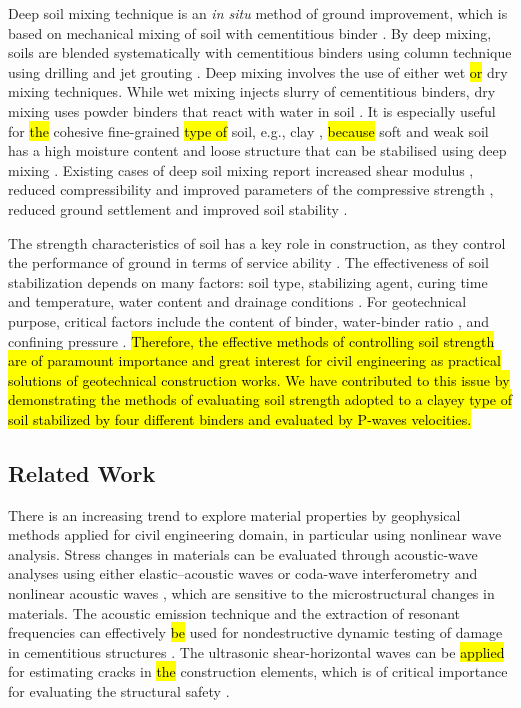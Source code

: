 \documentclass[USenglish,twocolumn]{article}
\begin{document}
Deep soil mixing technique is an \emph{in situ} method of ground improvement, which is based on mechanical mixing of soil with cementitious binder \cite{Kitazume,PorbahaetalA}. By deep mixing, soils are blended systematically with cementitious binders using column technique using drilling and jet grouting \cite{Larssonetal2015,Larsson}. Deep mixing involves the use of either wet \hl{or} dry mixing techniques. While wet mixing injects slurry of cementitious binders, dry mixing uses powder binders that react with\hl{ }water in\hl{ }soil \cite{PorbahaetalB}. It is especially useful for \hl{the }cohesive fine-grained \hl{type of }soil, e.g., clay \cite{Dahlstroem,Xieetal2012}, \hl{because }soft and weak soil has a high moisture content and loose structure that can be stabilised using deep mixing \cite{PorbahaetalC}. Existing cases of deep soil mixing report increased shear modulus \cite{Fangetal2001}, reduced compressibility and improved parameters of the compressive strength \cite{Mypati}, reduced ground settlement and improved soil stability \cite{Bergado}.

The strength characteristics of soil has a key role in construction, as they control the performance of ground in terms of service ability \cite{Munfakh}. The effectiveness of soil stabilization depends on many factors: soil type, stabilizing agent, curing time and temperature, water content and drainage conditions \cite{Winterkorn1991b}. For geotechnical purpose, critical factors include the content of binder, water-binder ratio \cite{Robertson,Zhang,Yangetal2010}, and confining pressure \cite{Rabbi,Xuetal2022,Huangetal2022}. \hl{Therefore, the effective methods of controlling soil strength are of paramount importance and great interest for civil engineering as practical solutions of geotechnical construction works. We have contributed to this issue by demonstrating the methods of evaluating soil strength adopted to a clayey type of soil stabilized by four different binders and evaluated by P-waves velocities.}

\subsection{Related Work} 

There is an increasing trend to explore material properties by geophysical methods applied for civil engineering domain, in particular using nonlinear wave analysis.\hl{ }Stress changes in materials can be evaluated through acoustic-wave analyses using either elastic–acoustic waves\hl{ }\cite{Jiangetal2017} or coda-wave interferometry and nonlinear acoustic waves \cite{Jiangetal2021}, which are sensitive to the microstructural changes in materials. The acoustic emission technique and the extraction of resonant frequencies can\hl{ }effectively\hl{ be} used for nondestructive dynamic testing of damage in cementitious structures \cite{Lacidogna}. The ultrasonic shear-horizontal waves can be \hl{applied }for estimating cracks in \hl{the }construction elements, which is of critical importance for evaluating the structural safety \cite{LinWang}.
\end{document}
